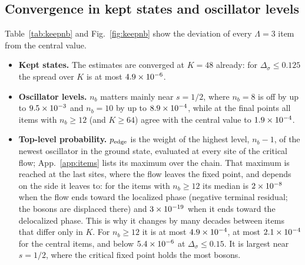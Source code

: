 \documentclass[10pt,a4paper]{article}
\newcommand{\Ds}{\Delta_\sigma}
\newcommand{\DE}{\Delta_E}
\begin{document}
\begin{table}[ht]\centering\scriptsize\setlength{\tabcolsep}{2.5pt}
\caption{The points without a plateau (central items). Settled value; plateau drift; change of the window $\DE$ per site at the settled
window; the three fitted $\Delta_\infty$ and $\omega$ for $S=30,25,20$; their median (the extrapolated value). At $\Ds=0.2$ and $0.175$
the median is the final value. Last column: the crossover fit of Sec.~\ref{sec:crosscheck} (median, number $n_{\rm fit}$ of accepted
fits), computed at $\Ds\ge0.2$ only; a cross-check, not adopted. $^\ast$Not converged in chain depth: cross-check only, not
used.}\label{tab:extrap}

\end{table}

\subsection{Convergence in kept states and oscillator levels}\label{sec:keepnb}
Table~\ref{tab:keepnb} and Fig.~\ref{fig:keepnb} show the deviation of every $\Lambda=3$ item from the central value.
\begin{itemize}
\item \textbf{Kept states.} The estimates are converged at $K=48$ already: for $\Ds\le0.125$ the spread over $K$ is at most
  $4.9\times10^{-6}$.
\item \textbf{Oscillator levels.} $n_b$ matters mainly near $s=1/2$, where $n_b=8$ is off by up to $9.5\times10^{-3}$ and $n_b=10$ by up to
  $8.9\times10^{-4}$, while at the final points all items with $n_b\ge12$ (and $K\ge64$) agree with the central value to $1.9\times10^{-4}$.
\item \textbf{Top-level probability.} $p_{\rm edge}$ is the weight of the highest level, $n_b-1$, of the newest oscillator in the
  ground state, evaluated at every site of the critical flow; App.~\ref{app:items} lists its maximum over the chain. That maximum is
  reached at the last sites, where the flow leaves the fixed point, and depends on the side it leaves to: for the items with
  $n_b\ge12$ its median is $2\times10^{-8}$ when the flow ends toward the localized phase (negative terminal residual; the bosons are
  displaced there) and $3\times10^{-19}$ when it ends toward the delocalized phase. This is why it changes by many decades between
  items that differ only in $K$. For $n_b\ge12$ it is at most $4.9\times10^{-4}$, at most $2.1\times10^{-4}$ for the central items, and
  below $5.4\times10^{-6}$ at $\Ds\le0.15$. It is largest near $s=1/2$, where the critical fixed point holds the most bosons.
\end{itemize}
\end{document}
